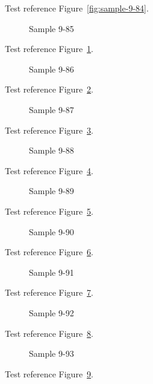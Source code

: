 Test reference Figure~\ref{fig:sample-9-84}.

\begin{figure}[tbhp]
\caption{Sample 9-85}
\label{fig:sample-9-85}
\end{figure}

Test reference Figure~\ref{fig:sample-9-85}.

\begin{figure}[tbhp]
\caption{Sample 9-86}
\label{fig:sample-9-86}
\end{figure}

Test reference Figure~\ref{fig:sample-9-86}.

\begin{figure}[tbhp]
\caption{Sample 9-87}
\label{fig:sample-9-87}
\end{figure}

Test reference Figure~\ref{fig:sample-9-87}.

\begin{figure}[tbhp]
\caption{Sample 9-88}
\label{fig:sample-9-88}
\end{figure}

Test reference Figure~\ref{fig:sample-9-88}.

\begin{figure}[tbhp]
\caption{Sample 9-89}
\label{fig:sample-9-89}
\end{figure}

Test reference Figure~\ref{fig:sample-9-89}.

\begin{figure}[tbhp]
\caption{Sample 9-90}
\label{fig:sample-9-90}
\end{figure}

Test reference Figure~\ref{fig:sample-9-90}.

\begin{figure}[tbhp]
\caption{Sample 9-91}
\label{fig:sample-9-91}
\end{figure}

Test reference Figure~\ref{fig:sample-9-91}.

\begin{figure}[tbhp]
\caption{Sample 9-92}
\label{fig:sample-9-92}
\end{figure}

Test reference Figure~\ref{fig:sample-9-92}.

\begin{figure}[tbhp]
\caption{Sample 9-93}
\label{fig:sample-9-93}
\end{figure}

Test reference Figure~\ref{fig:sample-9-93}.

